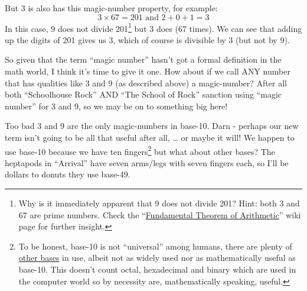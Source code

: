 \documentclass{article}
\newenvironment{jprIn}{\begin{adjustwidth}{2em}{}}{\end{adjustwidth}}
\begin{document}
But 3 is also has this magic-number property, for example:
\[ 3\times{}67=201 \text{ and } 2+0+1=3\]
In this case, 9 does not divide 201\footnote{Why is it immediately
apparent that 9 does not divide 201? Hint: both 3 and 67 are prime numbers.
Check the ``\href{https://en.wikipedia.org/wiki/Fundamental_theorem_of_arithmetic}{Fundamental
Theorem of Arithmetic}'' wiki page for further insight.}
but 3 does (67 times).
We can see that adding up the digits of 201 gives us 3,
which of course is divisible by 3 (but not by 9).

%
%

So given that the term ``magic number'' hasn't got
a formal definition in the math world, I think it's time to give it one.
How about if we call ANY number that has qualities like 3 and 9 (as 
described above) a magic-number?
After all both ``Schoolhouse Rock'' AND ``The School of Rock'' sanction using
``magic number'' for 3 and 9, so we may be on to something big here!

Too bad 3 and 9 are the only magic-numbers in base-10.
Darn - perhaps our new term isn't going to be all that useful after all, \dots{} or 
maybe it will!
We happen to use base-10 because we have ten fingers\footnote{To be honest, base-10 is
not ``universal'' among humans, there are plenty of
\href{https://www.youtube.com/watch?v=l4bmZ1gRqCc}{other bases} in use, albeit not
as widely used nor as mathematically useful as base-10. This doesn't count
octal, hexadecimal and binary which are used in the computer world
so by necessity are, mathematically speaking, useful.} but what about other bases?
The heptapods in ``Arrival'' have seven arms/legs with seven fingers each,
so I'll be dollars to donuts they use base-49.
\end{document}
